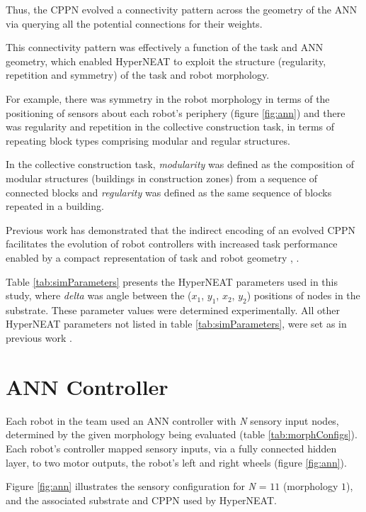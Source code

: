 Thus, the CPPN evolved a connectivity pattern across the geometry of the ANN via querying all the potential
connections for their weights.

This connectivity pattern was effectively a function of the task and ANN geometry,
which enabled HyperNEAT to exploit the structure (regularity, repetition and symmetry) of the task and robot morphology.

For example, there was symmetry in the robot morphology in terms of the positioning of sensors about each
robot's periphery (figure \ref{fig:ann}) and there was regularity and repetition in the collective construction
task, in terms of repeating block types comprising modular and regular structures.

In the collective construction task, \textit{modularity} was defined as the composition of modular structures
(buildings in construction zones) from a sequence of connected blocks and \textit{regularity} was defined
as the same sequence of blocks repeated in a building.

Previous work has demonstrated that the indirect encoding of an evolved CPPN facilitates the evolution of
robot controllers with increased task performance enabled by a compact representation
of task and robot geometry \cite{DAmbrosioStanley2008}, \cite{WatsonNitschke2015SSCI}.

Table \ref{tab:simParameters} presents the HyperNEAT parameters used in this study, where \textit{delta}
was angle between the ($x_{1}$, $y_{1}$, $x_{2}$, $y_{2}$) positions of nodes in the substrate.
These parameter values were determined experimentally.   All other HyperNEAT parameters not listed in
table \ref{tab:simParameters}, were set as in previous work \cite{DAmbrosioStanley2008}.

\section{ANN Controller}

Each robot in the team used an ANN controller with
\textit{N} sensory input nodes, determined by the given morphology being evaluated (table \ref{tab:morphConfigs}).
Each robot's controller mapped sensory inputs, via a fully connected hidden layer, to two motor outputs, the
robot's left and right wheels (figure \ref{fig:ann}). %

Figure \ref{fig:ann} illustrates the sensory configuration for \textit{N} = $11$ (morphology $1$), and the
associated substrate and CPPN used by HyperNEAT.

